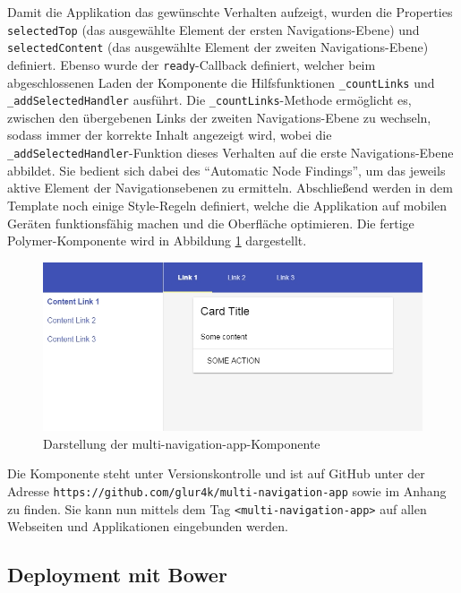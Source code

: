 Damit die Applikation das gewünschte Verhalten aufzeigt, wurden die Properties \texttt{selectedTop} (das ausgewählte Element der ersten Navigations-Ebene) und \texttt{selectedContent} (das ausgewählte Element der zweiten Navigations-Ebene) definiert. Ebenso wurde der \texttt{ready}-Callback definiert, welcher beim abgeschlossenen Laden der Komponente die Hilfsfunktionen \texttt{\_countLinks} und \texttt{\_addSelectedHandler} ausführt. Die \texttt{\_countLinks}-Methode ermöglicht es, zwischen den übergebenen Links der zweiten Navigations-Ebene zu wechseln, sodass immer der korrekte Inhalt angezeigt wird, wobei die \texttt{\_addSelectedHandler}-Funktion dieses Verhalten auf die erste Navigations-Ebene abbildet. Sie bedient sich dabei des ``Automatic Node Findings'', um das jeweils aktive Element der Navigationsebenen zu ermitteln. Abschließend werden in dem Template noch einige Style-Regeln definiert, welche die Applikation auf mobilen Geräten funktionsfähig machen und die Oberfläche optimieren. Die fertige Polymer-Komponente wird in Abbildung \ref{fig:ddmnak} dargestellt.

\begin{figure}[htbp]
 \centering
 \includegraphics[width=12cm]{kapitel7/bilder/1-multi-navigation-app}
 \caption{Darstellung der multi-navigation-app-Komponente}
 \label{fig:ddmnak}
\end{figure}

Die Komponente steht unter Versionskontrolle und ist auf GitHub unter der Adresse \texttt{https://github.com/glur4k/multi-navigation-app} sowie im Anhang  zu finden. Sie kann nun mittels dem Tag \texttt{\textless{}multi-navigation-app\textgreater{}} auf allen Webseiten und Applikationen eingebunden werden.


\subsection{Deployment mit Bower}\label{deployment-mit-bower}

